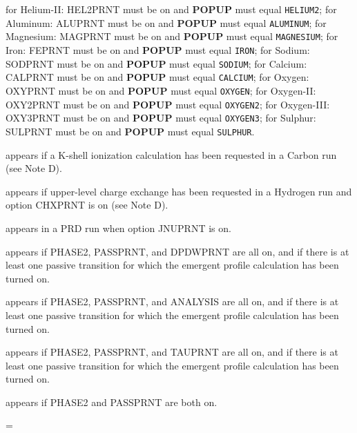 \bull for Helium-II: HEL2PRNT must be on and {\bf POPUP} must equal
{\tt HELIUM2};
\bull for Aluminum: ALUPRNT must be on and {\bf POPUP} must equal
{\tt ALUMINUM};
\bull for Magnesium: MAGPRNT must be on and {\bf POPUP} must equal
{\tt MAGNESIUM};
\bull for Iron: FEPRNT must be on and {\bf POPUP} must equal
{\tt IRON};
\bull for Sodium: SODPRNT must be on and {\bf POPUP} must equal
{\tt SODIUM};
\bull for Calcium: CALPRNT must be on and {\bf POPUP} must equal
{\tt CALCIUM};
\bull for Oxygen: OXYPRNT must be on and {\bf POPUP} must equal
{\tt OXYGEN};
\bull for Oxygen-II: OXY2PRNT must be on and {\bf POPUP} must equal
{\tt OXYGEN2};
\bull for Oxygen-III: OXY3PRNT must be on and {\bf POPUP} must equal
{\tt OXYGEN3};
\bull for Sulphur: SULPRNT must be on and {\bf POPUP} must equal
{\tt SULPHUR}.
\ej
{} \par
appears if a K-shell ionization calculation has been requested in a 
Carbon run (see Note D).
\blankline
{} \par
appears if upper-level charge exchange has been requested in a Hydrogen
run and option CHXPRNT is on (see Note D).
\blankline
{} \par
appears in a PRD run when option JNUPRNT is on.
\blankline
{} \par
appears if PHASE2, PASSPRNT, and DPDWPRNT are
all on, and if there is at least one passive transition for which the emergent
profile calculation has been turned on.
\blankline
{} \par
appears if PHASE2, PASSPRNT, and ANALYSIS are
all on, and if there is at least one passive transition for which the emergent
profile calculation has been turned on.
\blankline
{} \par
appears if PHASE2, PASSPRNT, and TAUPRNT are
all on, and if there is at least one passive transition for which the emergent
profile calculation has been turned on.
\blankline
{} \par
appears if PHASE2 and PASSPRNT are both on.
\ej

\headline={\hfil}

